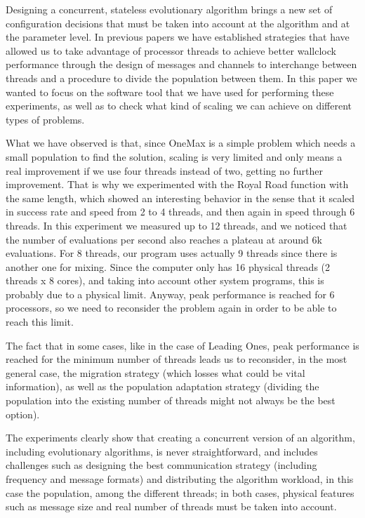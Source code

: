 \documentclass[runningheads]{llncs}\usepackage[]{graphicx}\usepackage[]{color}
\begin{document}
Designing a concurrent, stateless evolutionary algorithm brings a new
set of configuration decisions that must be taken into account at the algorithm and
at the parameter level. In previous papers we have established
strategies that have allowed us to take advantage of processor threads
to achieve better wallclock performance through the design of messages
and channels to interchange between threads and a procedure to divide
the population between them. In this paper we wanted to focus on the
software tool that we have used for performing these experiments, as
well as to check what kind of scaling we can achieve on different
types of problems. 


What we have observed is that, since OneMax is a simple problem which
needs a small population to find the solution, scaling is very limited
and only means a real improvement if we use four threads instead of
two, getting no further improvement. That is why we experimented with
the Royal Road function with the same length, which showed an
interesting behavior in the sense that it scaled in success rate and
speed from 2 to 4 threads, and then again in speed through 6
threads. In this experiment we measured up to 12 threads, and we
noticed that the number of evaluations per second also reaches a
plateau at around 6k evaluations. For 8 threads, our program uses
actually 9 threads since there is another one for mixing. Since the
computer only has 16 physical threads (2 threads x 8 cores), and
taking into account other system programs, this is probably due to a
physical limit. Anyway, peak performance is reached for 6 processors,
so we need to reconsider the problem again in order to be able to
reach this limit.

The fact that in some cases, like in the case of Leading Ones, peak
performance is reached for the minimum number of threads leads us to
reconsider, in the most general case, the migration strategy (which
losses what could be vital information), as well as the population
adaptation strategy (dividing the population into the existing number of
threads might not always be the best option).

The experiments clearly show that creating a concurrent version of an
algorithm, including evolutionary algorithms, is never
straightforward, and includes challenges such as designing the best
communication strategy (including frequency and message formats) and
distributing the algorithm workload, in this case the population,
among the different threads; in both cases, physical features such as
message size and real number of threads must be taken into account.
\end{document}
